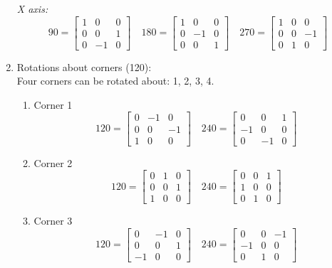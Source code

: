 \documentclass{article}
\begin{document}
\begin{enumerate}
\textit{X axis:}\\
\begin{equation*}
90 = \begin{bmatrix}
1 & 0 & 0\\
0 & 0 & 1\\
0 & -1 & 0
\end{bmatrix}
\quad
180 = \begin{bmatrix}
1 & 0 & 0\\
0 & -1 & 0\\
0 & 0 & 1
\end{bmatrix}
\quad
270 = \begin{bmatrix}
1 & 0 & 0\\
0 & 0 & -1\\
0 & 1 & 0
\end{bmatrix}
\end{equation*}

\item Rotations about corners (120\degree):\\
Four corners can be rotated about: 1, 2, 3, 4.
\begin{enumerate}
\item Corner 1\\
\begin{equation*}
120 = \begin{bmatrix}
0 & -1 & 0\\
0 & 0 & -1\\
1 & 0 & 0
\end{bmatrix}
\quad
240 = \begin{bmatrix}
0 & 0 & 1\\
-1 & 0 & 0\\
0 & -1 & 0
\end{bmatrix}
\end{equation*}

\item Corner 2\\
\begin{equation*}
120 = \begin{bmatrix}
0 & 1 & 0\\
0 & 0 & 1\\
1 & 0 & 0
\end{bmatrix}
\quad
240 = \begin{bmatrix}
0 & 0 & 1\\
1 & 0 & 0\\
0 & 1 & 0
\end{bmatrix}
\end{equation*}

\item Corner 3\\
\begin{equation*}
120 = \begin{bmatrix}
0 & -1 & 0\\
0 & 0 & 1\\
-1 & 0 & 0
\end{bmatrix}
\quad
240 = \begin{bmatrix}
0 & 0 & -1\\
-1 & 0 & 0\\
0 & 1 & 0
\end{bmatrix}
\end{equation*}


\end{enumerate}
\end{enumerate}
\end{document}
